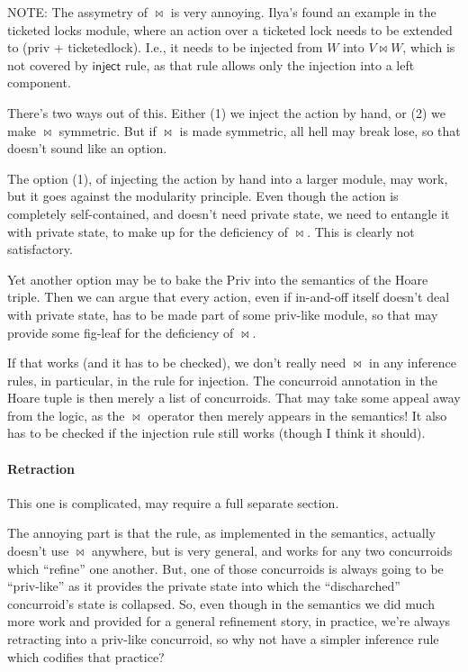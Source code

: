 NOTE: The assymetry of $\bowtie$ is very annoying. Ilya's found an
example in the ticketed locks module, where an action over a ticketed
lock needs to be extended to (priv + ticketedlock). I.e., it needs to
be injected from $W$ into $V \bowtie W$, which is not covered by
$\mathsf{inject}$ rule, as that rule allows only the injection into a
left component.

There's two ways out of this. Either (1) we inject the action by hand,
or (2) we make $\bowtie$ symmetric. But if $\bowtie$ is made
symmetric, all hell may break lose, so that doesn't sound like an
option.

The option (1), of injecting the action by hand into a larger module,
may work, but it goes against the modularity principle. Even though
the action is completely self-contained, and doesn't need private
state, we need to entangle it with private state, to make up for the
deficiency of $\bowtie$. This is clearly not satisfactory.

Yet another option may be to bake the Priv into the semantics of the
Hoare triple. Then we can argue that every action, even if in-and-off
itself doesn't deal with private state, has to be made part of some
priv-like module, so that may provide some fig-leaf for the deficiency
of $\bowtie$.

If that works (and it has to be checked), we don't really need
$\bowtie$ in any inference rules, in particular, in the rule for
injection. The concurroid annotation in the Hoare tuple is then merely
a list of concurroids. That may take some appeal away from the logic,
as the $\bowtie$ operator then merely appears in the semantics!  It
also has to be checked if the injection rule still works (though I
think it should).

\paragraph{Retraction}

This one is complicated, may require a full separate section.

The annoying part is that the rule, as implemented in the semantics,
actually doesn't use $\bowtie$ anywhere, but is very general, and
works for any two concurroids which ``refine'' one another. But, one
of those concurroids is always going to be ``priv-like'' as it
provides the private state into which the ``discharched'' concurroid's
state is collapsed. So, even though in the semantics we did much more
work and provided for a general refinement story, in practice, we're
always retracting into a priv-like concurroid, so why not have a
simpler inference rule which codifies that practice?



